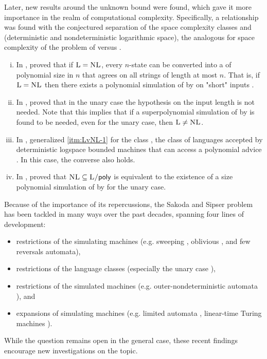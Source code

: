 Later, new results around the unknown bound were found, which gave it more importance in the realm of computational complexity.
Specifically, a relationship was found with the conjectured separation of the space complexity classes \cL and \cNL (deterministic and nondeterministic logarithmic space), the analogous for space complexity of the problem of \cP versus \cNP.
\begin{enumerate}[(i)]
	\item\label{itm:LvNL-1} In \citeyear{BerLin77}, \citeauthor{BerLin77} proved that if $\textsc{L}=\textsc{NL}$, every $n$-state \TNFA can be converted into a \TDFA of polynomial size in $n$ that agrees on all strings of length at most $n$.
	      That is, if $\textsc{L}=\textsc{NL}$ then there exists a polynomial simulation of \TNFAs by \TDFAs on "short" inputs \cite{BerLin77}.
	\item In \citeyear{GefPig11}, \citeauthor{GefPig11} proved that in the unary case the hypothesis on the input length is not needed.
	      Note that this implies that if a superpolynomial simulation of \TNFAs by \TDFAs is found to be needed, even for the unary case, then $\textsc{L}\ne\textsc{NL}$.
	\item In \citeyear{Kap14}, \citeauthor{Kap14} generalized \ref{itm:LvNL-1} for the class \cPolyL, the class of languages accepted by deterministic logspace bounded machines that can access a polynomial advice \cite{Kap14,KarLip82}. In this case, the converse also holds.
	\item In \citeyear{KapPig12}, \citeauthor{KapPig12} proved that $\textsc{NL}\subseteq\textsc{L/\ensuremath{\mathsf{poly}}}$ is equivalent to the existence of a size polynomial simulation of \TNFAs by \TDFAs for the unary case.
\end{enumerate}

Because of the importance of its repercussions, the Sakoda and Sipser problem has been tackled in many ways over the past decades, spanning four lines of development:
\begin{itemize}
	\item restrictions of the simulating machines (e.g. sweeping \cite{Sip80}, oblivious \cite{HroSch03}, and few reversals \cite{Kap13} automata),
	\item restrictions of the language classes (especially the unary case \cite{GefMer+07}),
	\item restrictions of the simulated machines (e.g. outer-nondeterministic automata \cite{GefGui+14,KapPig12}), and
	\item expansions of simulating machines (e.g. limited automata \cite{PigPis14,PigPri19,GuiPri19,PigPri+22}, linear-time Turing machines \cite{Pru14,GuiPig+18,Hen65,GuiPig+23}).
\end{itemize}
While the question remains open in the general case, these recent findings encourage new investigations on the topic.

